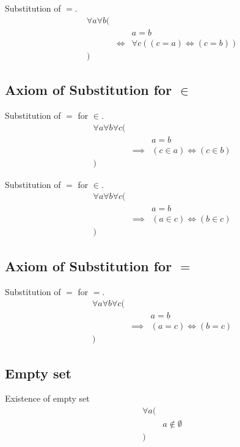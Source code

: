\begin{axm}
\label{Axiom:substitution_of_equality}
Substitution of $=$.
\begin{align*}
& \forall a \forall b ( \\
& & & a = b \\
& & \iff & \forall c ((c = a) \iff (c = b)) \\
& )
\end{align*}
\end{axm}

\subsection{Axiom of Substitution for $\in$}
\begin{prop}
\label{Proposition:equality_substitution_in_1}
Substitution of $=$ for $\in$.
\begin{align*}
& \forall a \forall b \forall c ( \\
& & & a = b \\
& & \implies & (c \in a) \iff (c \in b) \\
& )
\end{align*}
\end{prop}

\begin{prop}
\label{Proposition:equality_substitution_in_2}
Substitution of $=$ for $\in$.
\begin{align*}
& \forall a \forall b \forall c ( \\
& & & a = b \\
& & \implies & (a \in c) \iff (b \in c) \\
& )
\end{align*}
\end{prop}

\subsection{Axiom of Substitution for $=$}
\begin{prop}
\label{Proposition:equality_substitution_equality}
Substitution of $=$ for $=$.
\begin{align*}
& \forall a \forall b \forall c ( \\
& & & a = b \\
& & \implies & (a = c) \iff (b = c) \\
& )
\end{align*}
\end{prop}

\subsection{Empty set}
\begin{axm}
\label{Axiom:existence_of_empty_set}
Existence of empty set
\begin{align*}
& \forall a ( \\
& & a \notin \emptyset \\
& )
\end{align*}
\end{axm}


